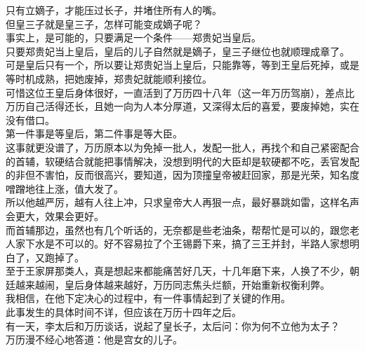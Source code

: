 \begin{multicols}{\theparacolNo}
只有立嫡子，才能压过长子，并堵住所有人的嘴。\\

但皇三子就是皇三子，怎样可能变成嫡子呢？\\

事实上，是可能的，只要满足一个条件——郑贵妃当皇后。\\

只要郑贵妃当上皇后，皇后的儿子自然就是嫡子，皇三子继位也就顺理成章了。\\

可是皇后只有一个，所以要让郑贵妃当上皇后，只能靠等，等到王皇后死掉，或是等时机成熟，把她废掉，郑贵妃就能顺利接位。\\

可惜这位王皇后身体很好，一直活到了万历四十八年（这一年万历驾崩），差点比万历自己活得还长，且她一向为人本分厚道，又深得太后的喜爱，要废掉她，实在没有借口。\\

第一件事是等皇后，第二件事是等大臣。\\

这事就更没谱了，万历原本以为免掉一批人，发配一批人，再找个和自己紧密配合的首辅，软硬结合就能把事情解决，没想到明代的大臣却是软硬都不吃，丢官发配的非但不害怕，反而很高兴，要知道，因为顶撞皇帝被赶回家，那是光荣，知名度噌蹭地往上涨，值大发了。\\

所以他越严厉，越有人往上冲，只求皇帝大人再狠一点，最好暴跳如雷，这样名声会更大，效果会更好。\\

而首辅那边，虽然也有几个听话的，无奈都是些老油条，帮帮忙是可以的，跟您老人家下水是不可以的。好不容易拉了个王锡爵下来，搞了三王并封，半路人家想明白了，又跑掉了。\\

至于王家屏那类人，真是想起来都能痛苦好几天，十几年磨下来，人换了不少，朝廷越来越闹，皇后身体越来越好，万历同志焦头烂额，开始重新权衡利弊。\\

我相信，在他下定决心的过程中，有一件事情起到了关键的作用。\\

此事发生的具体时间不详，但应该在万历十四年之后。\\

有一天，李太后和万历谈话，说起了皇长子，太后问：你为何不立他为太子？\\

万历漫不经心地答道：他是宫女的儿子。\\


\end{multicols}
